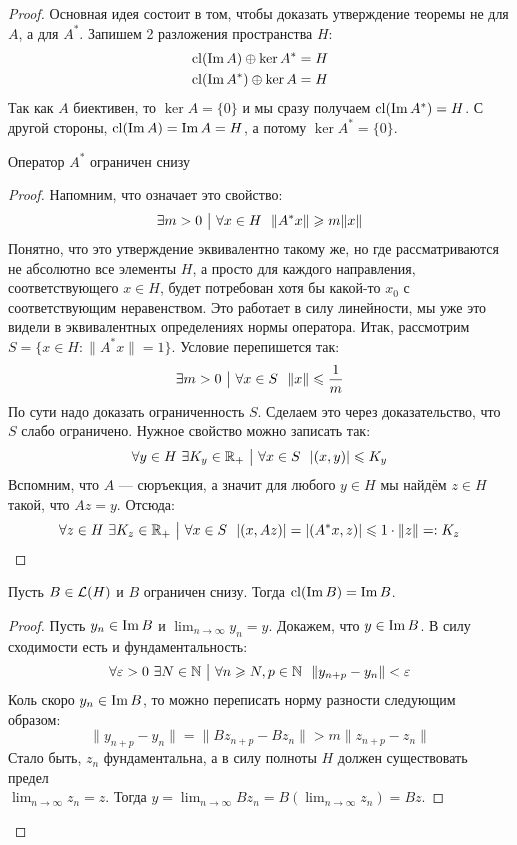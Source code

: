 \begin{proof}
	Основная идея состоит в том, чтобы доказать утверждение теоремы не для $A$, а для $A^*$. Запишем 2 разложения пространства $H$:
	\begin{align*}
		&{\operatorname{cl}(\operatorname{Im} A) \oplus \ker A^* = H}
		\\
		&{\operatorname{cl}(\operatorname{Im} A^*) \oplus \ker A = H}
	\end{align*}
	Так как $A$ биективен, то $\ker A = \{0\}$ и мы сразу получаем $\operatorname{cl}(\operatorname{Im} A^*) = H$. С другой стороны, $\operatorname{cl}(\operatorname{Im} A) = \operatorname{Im} A = H$, а потому $\ker A^* = \{0\}$.
	\begin{lemma} \label{conj_op_bot_bounded_lemma}
		Оператор $A^*$ ограничен снизу
	\end{lemma}
	
	\begin{proof}
		Напомним, что означает это свойство:
		\[
			\exists m > 0 \such \forall x \in H\ \ \|A^*x\| \ge m\|x\|
		\]
		Понятно, что это утверждение эквивалентно такому же, но где рассматриваются не абсолютно все элементы $H$, а просто для каждого направления, соответствующего $x \in H$, будет потребован хотя бы какой-то $x_0$ с соответствующим неравенством. Это работает в силу линейности, мы уже это видели в эквивалентных определениях нормы оператора. Итак, рассмотрим $S = \{x \in H \colon \|A^*x\| = 1\}$. Условие перепишется так:
		\[
			\exists m > 0 \ \big|\  \forall x \in S\ \ \|x\| \leqslant \frac{1}{m}
		\]
		По сути надо доказать ограниченность $S$. Сделаем это через доказательство, что $S$ слабо ограничено. Нужное свойство можно записать так:
		\[
			\forall y \in H\ \exists K_y \in \mathbb{R}_+ \ \big|\  \forall x \in S\ \ |(x, y)| \leqslant K_y
		\]
		Вспомним, что $A$ --- сюръекция, а значит для любого $y \in H$ мы найдём $z \in H$ такой, что $Az = y$. Отсюда:
		\[
			\forall z \in H\ \exists K_z \in \mathbb{R}_+ \ \big|\  \forall x \in S\ \ |(x, Az)| = |(A^*x, z)| \leqslant 1 \cdot \|z\| =: K_z
		\]
	\end{proof}
	
	
	\begin{lemma}
		Пусть $B \in \mathcal{L}(H)$ и $B$ ограничен снизу. Тогда $\operatorname{cl}(\operatorname{Im} B) = \operatorname{Im} B$.
	\end{lemma}
	
	\begin{proof}
		Пусть $y_n \in \operatorname{Im} B$ и $\lim_{n \to \infty} y_n = y$. Докажем, что $y \in \operatorname{Im} B$. В силу сходимости есть и фундаментальность:
		\[
			\forall \varepsilon > 0\ \exists N \in \mathbb{N} \ \big|\  \forall n \geqslant N, p \in \mathbb{N}\ \ \|y_{n + p} - y_n\| < \varepsilon
		\]
		Коль скоро $y_n \in \operatorname{Im} B$, то можно переписать норму разности следующим образом:
		\[
			\|y_{n + p} - y_n\| = \|Bz_{n + p} - Bz_n\| > m\|z_{n + p} - z_n\|
		\]
		Стало быть, $z_n$ фундаментальна, а в силу полноты $H$ должен существовать предел \\ $\lim_{n \to \infty} z_n = z$. Тогда $y = \lim_{n \to \infty} Bz_n = B( \lim_{n \to \infty} z_n) = Bz$.
	\end{proof}
	

\end{proof}
